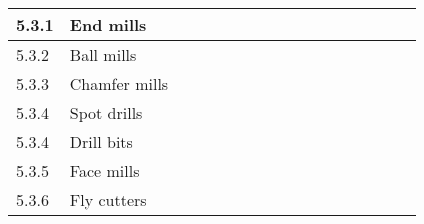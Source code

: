 \documentclass[a5paper]{article}
\begin{document}
\begin{tabularx}{\textwidth}{|l|X|c|c|c|c|c|c|c|c|c|c|c|c|c|c|c|}
    5.3.1 & \hspace{5mm} End mills
    & & & & & & & & & & & & & & & \\ \hline
    5.3.2 & \hspace{5mm} Ball mills
    & & & & & & & & & & & & & & & \\ \hline
    5.3.3 & \hspace{5mm} Chamfer mills
    & & & & & & & & & & & & & & & \\ \hline
    5.3.4 & \hspace{5mm} Spot drills
    & & & & & & & & & & & & & & & \\ \hline
    5.3.4 & \hspace{5mm} Drill bits
    & & & & & & & & & & & & & & & \\ \hline
    5.3.5 & \hspace{5mm} Face mills
    & & & & & & & & & & & & & & & \\ \hline
    5.3.6 & \hspace{5mm} Fly cutters
    & & & & & & & & & & & & & & & \\ \hline
\end{tabularx}
\end{document}

